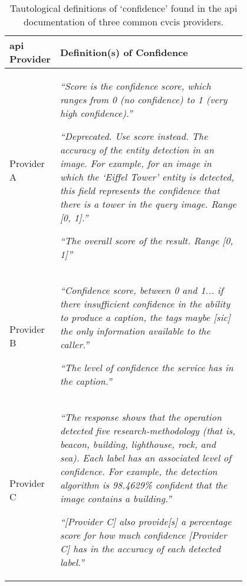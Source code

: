 \begin{table}[hbt]
  \centering
  \caption[Tautological definitions of confidence found in API documentation]{Tautological definitions of `confidence' found in the \gls{api} documentation of three common \gls{cvcis} providers.}
  \label{tab:introduction:motivation:scenario:pam:tautological}
  \begin{tabular}{l|p{0.8\linewidth}}
    \toprule
    \bfseries \gls{api} Provider &
    \bfseries Definition(s) of Confidence \\
    \midrule
    Provider A &
      \itshape  
      ``Score is the confidence score, which ranges from 0 (no confidence) to 1 (very high confidence).''
      \upshape
      \citep{Google:ConfidenceScore_DocsLabel}
      \bigskip
      
      \itshape  
      ``Deprecated. Use score instead. The accuracy of the entity detection in an image. For example, for an image in which the `Eiffel Tower' entity is detected, this field represents the confidence that there is a tower in the query image. Range [0, 1].'' 
      \upshape
      \citep{Google:ConfidenceScore_DotNet} 
      \bigskip
      
      \itshape  
      ``The overall score of the result. Range [0, 1]''
      \upshape
      \citep{Google:ConfidenceScore_DotNet} 
      \bigskip
    \\ 
    Provider B &
      \itshape  
        ``Confidence score, between 0 and 1... if there insufficient confidence in the ability to produce a caption, the tags maybe [sic] the only information available to the caller.''
      \upshape
      \citep{Azure:ConfidenceScore_HowToCall}
      \bigskip
      
      \itshape  
        ``The level of confidence the service has in the caption.''
      \upshape
      \citep{Azure:ConfidenceScore_JavaDocs}    
      \bigskip
    \\
    Provider C &
      \itshape  
        ``The response shows that the operation detected five research-methodology (that is, beacon, building, lighthouse, rock, and sea). Each label has an associated level of confidence. For example, the detection algorithm is 98.4629\% confident that the image contains a building.''
      \upshape
      \citep{AWS:ConfidenceScore_DetectLabel}
      \bigskip
      
      \itshape  
        ``[Provider C] also provide[s] a percentage score for how much confidence [Provider C] has in the accuracy of each detected label.''
      \upshape
      \citep{AWS:ConfidenceScore_DetectObjScene}
    \\
    \bottomrule
  \end{tabular}
\end{table}
